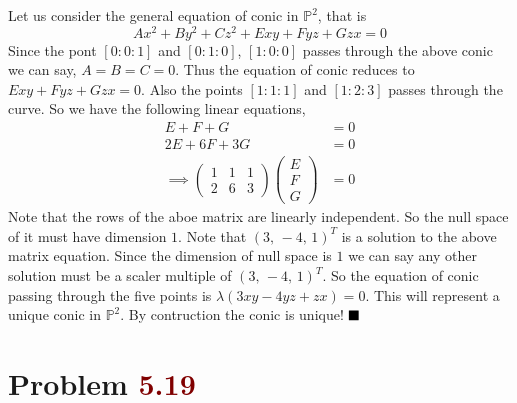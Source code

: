 \documentclass[12pt]{article}
\begin{document}
Let us consider the general equation of conic in $\mathbb{P}^2$, that is $$Ax^2+By^2+Cz^2+Exy+Fyz + G zx =0$$ Since the pont $[0:0:1]$ and $[0:1:0]$, $[1:0:0]$ passes through  the above conic we can say, $A=B=C=0$. Thus the equation of conic reduces to $E xy + Fyz+Gzx=0$. Also the points $[1:1:1]$ and $[1:2:3]$ passes through the curve. So we have the following linear equations,
\begin{align*}
   E+F+G                         & =0         \\
   2E+6F +3G                     & =0         \\
   \implies \begin{pmatrix}
               1 & 1 & 1 \\
               2 & 6 & 3
            \end{pmatrix} \begin{pmatrix}
                             E \\ F \\ G
                          \end{pmatrix} & = 0
\end{align*}
Note that the rows of the aboe matrix are linearly independent. So the null space of it must have dimension $1$. Note that $(3, \, -4, \,1)^T$ is a solution to the above matrix equation. Since the dimension of null space is $1$ we can say any other solution must be a scaler multiple of $(3,\, -4, \,1)^T$. So the equation of conic passing through the five  points is $\lambda (3xy -4yz+zx)=0$. This will represent a unique conic in $\mathbb{P}^2$. By contruction the conic is unique! $\hfill \blacksquare$

\section*{Problem \textcolor{maroon}{5.19}}
\end{document}
